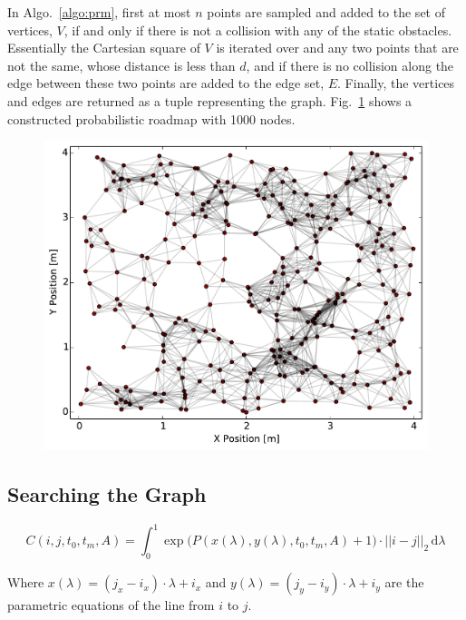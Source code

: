 
In Algo.~\ref{algo:prm}, first at most $n$ points are sampled and added to the
set of vertices, $V$, if and only if there is not a collision with any of the
static obstacles. Essentially the Cartesian square of $V$ is iterated over and
any two points that are not the same, whose distance is less than $d$, and if
there is no collision along the edge between these two points are added to the
edge set, $E$. Finally, the vertices and edges are returned as a tuple
representing the graph. Fig.~\ref{fig:prm} shows a constructed probabilistic
roadmap with 1000 nodes.

\begin{figure}[h!]
    \centering
    \includegraphics[width=0.8\linewidth]{figs/roadmap}
    \caption{}
    \label{fig:prm}
\end{figure}

\subsection{Searching the Graph}


\begin{equation}
    C(i, j, t_0, t_m, A) = \int^1_0 \exp{\Big(
        P(x(\lambda), y(\lambda), t_0, t_m, A) + 1 \Big)
    } \cdot ||i - j||_{2} \,\mathrm{d}\lambda
    \label{eq:cost}
\end{equation}

Where $x(\lambda) = (j_x - i_x) \cdot \lambda + i_x$ and $y(\lambda) = (j_y -
i_y) \cdot \lambda + i_y$ are the parametric equations of the line from $i$ to
$j$.

